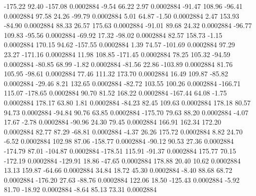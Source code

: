      -175.22       92.40     -157.08     0.0002884
       -9.54       66.22        2.97     0.0002884
      -91.47      108.96      -96.41     0.0002884
       97.58       24.26      -99.79     0.0002884
        5.01       64.87       -1.50     0.0002884
        2.47      153.93      -84.90     0.0002884
       88.33       26.57      175.63     0.0002884
      -91.01       89.68       24.32     0.0002884
      -96.77      109.83      -95.56     0.0002884
      -69.92       17.32      -98.02     0.0002884
       82.57      158.73       -1.15     0.0002884
      170.15       94.62     -157.55     0.0002884
        1.39       74.57     -101.69     0.0002884
       97.29       23.27     -171.16     0.0002884
       11.98      108.85     -171.45     0.0002884
       78.25      105.32      -94.59     0.0002884
      -80.85       68.99       -1.82     0.0002884
      -81.56       22.86     -103.89     0.0002884
       81.76      105.95      -98.61     0.0002884
       77.46      111.32      173.70     0.0002884
       16.49      109.87      -85.82     0.0002884
      -29.46        8.21      132.65     0.0002884
      -82.72      103.55      100.26     0.0002884
     -166.71      115.07     -178.65     0.0002884
       90.70       81.52      168.22     0.0002884
     -167.44       64.08       -1.75     0.0002884
      178.17       63.80        1.81     0.0002884
      -84.23       82.45      109.63     0.0002884
      178.18       80.57       94.73     0.0002884
      -94.84       90.76       63.85     0.0002884
     -175.70       79.63       88.20     0.0002884
       -4.07       17.67       -2.78     0.0002884
      -90.96       24.30       79.45     0.0002884
      166.91      162.34      172.20     0.0002884
       82.77       87.29      -68.81     0.0002884
       -4.37       26.26      175.72     0.0002884
        8.82       24.70       -6.52     0.0002884
      102.98       87.06     -158.77     0.0002884
      -90.12       90.53       27.36     0.0002884
     -174.79       87.01     -104.87     0.0002884
     -178.51      115.91      -91.37     0.0002884
      175.77       70.15     -172.19     0.0002884
     -129.91       18.86      -47.65     0.0002884
      178.88       20.40       10.62     0.0002884
       13.13      159.87      -64.66     0.0002884
       34.84       18.72       45.30     0.0002884
       -8.40       88.68       68.72     0.0002884
     -176.20       27.63      -88.76     0.0002884
      122.06       18.50     -125.43     0.0002884
       -5.92       81.70      -18.92     0.0002884
       -8.64       85.13       73.31     0.0002884
